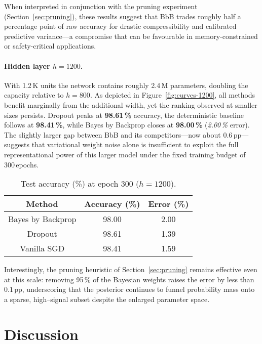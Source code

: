 \documentclass{article}
\begin{document}
When interpreted in conjunction with the pruning experiment (Section~\ref{sec:pruning}), these results suggest that BbB trades roughly half a percentage point of raw accuracy for drastic compressibility and calibrated predictive variance—a compromise that can be favourable in memory-constrained or safety-critical applications.
\paragraph{Hidden layer $h=1200$.}
With 1.2\,K units the network contains roughly 2.4\,M parameters, doubling the capacity relative to $h=800$.  As depicted in Figure~\ref{fig:curves-1200}, all methods benefit marginally from the additional width, yet the ranking observed at smaller sizes persists.  Dropout peaks at \textbf{98.61\,\%} accuracy, the deterministic baseline follows at \textbf{98.41\,\%}, while Bayes by Backprop closes at \textbf{98.00\,\%} (\emph{2.00\,\%} error).  The slightly larger gap between BbB and its competitors—now about $0.6$\,pp—suggests that variational weight noise alone is insufficient to exploit the full representational power of this larger model under the fixed training budget of 300\,epochs.

\begin{table}[h]
\centering
\caption{Test accuracy (\%) at epoch 300 ($h=1200$).}
\label{tab:acc-1200}
\begin{tabular}{ccc}
\toprule
Method & Accuracy (\%) & Error (\%) \\
\midrule
Bayes by Backprop & 98.00 & 2.00 \\
Dropout           & 98.61 & 1.39 \\
Vanilla SGD       & 98.41 & 1.59 \\
\bottomrule
\end{tabular}
\end{table}

Interestingly, the pruning heuristic of Section~\ref{sec:pruning} remains effective even at this scale: removing 95\,\% of the Bayesian weights raises the error by less than $0.1$\,pp, underscoring that the posterior continues to funnel probability mass onto a sparse, high–signal subset despite the enlarged parameter space.

\section{Discussion}
\end{document}
